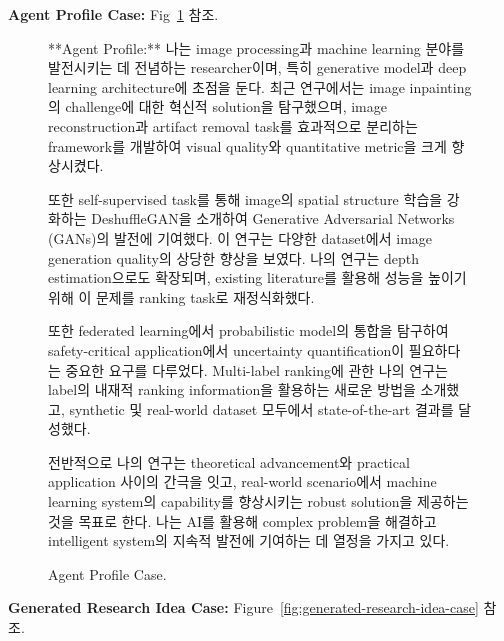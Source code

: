 \textbf{Agent Profile Case:} Fig~\ref{fig:agent-profile-case} 참조.
\begin{figure}[htbp]
\centering
\begin{tcolorbox}[colback=yellow!2!white, colframe=gray!50!yellow]
\begin{minipage}{\linewidth}
\small
**Agent Profile:**
나는 image processing과 machine learning 분야를 발전시키는 데 전념하는 researcher이며, 특히 generative model과 deep learning architecture에 초점을 둔다. 최근 연구에서는 image inpainting의 challenge에 대한 혁신적 solution을 탐구했으며, image reconstruction과 artifact removal task를 효과적으로 분리하는 framework를 개발하여 visual quality와 quantitative metric을 크게 향상시켰다.

또한 self-supervised task를 통해 image의 spatial structure 학습을 강화하는 DeshuffleGAN을 소개하여 Generative Adversarial Networks (GANs)의 발전에 기여했다. 이 연구는 다양한 dataset에서 image generation quality의 상당한 향상을 보였다. 나의 연구는 depth estimation으로도 확장되며, existing literature를 활용해 성능을 높이기 위해 이 문제를 ranking task로 재정식화했다.

또한 federated learning에서 probabilistic model의 통합을 탐구하여 safety-critical application에서 uncertainty quantification이 필요하다는 중요한 요구를 다루었다. Multi-label ranking에 관한 나의 연구는 label의 내재적 ranking information을 활용하는 새로운 방법을 소개했고, synthetic 및 real-world dataset 모두에서 state-of-the-art 결과를 달성했다.

전반적으로 나의 연구는 theoretical advancement와 practical application 사이의 간극을 잇고, real-world scenario에서 machine learning system의 capability를 향상시키는 robust solution을 제공하는 것을 목표로 한다. 나는 AI를 활용해 complex problem을 해결하고 intelligent system의 지속적 발전에 기여하는 데 열정을 가지고 있다.
\end{minipage}
\end{tcolorbox}
\caption{Agent Profile Case.}
\label{fig:agent-profile-case}
\end{figure}

\textbf{Generated Research Idea Case:} Figure~\ref{fig:generated-research-idea-case} 참조.

